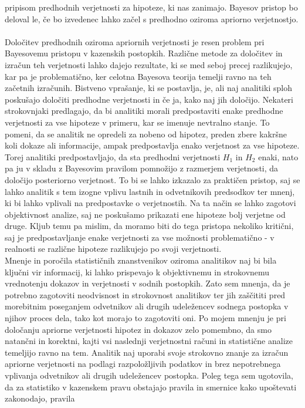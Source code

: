 \documentclass[12pt,a4paper]{amsart}
\theoremstyle{definition} %
\theoremstyle{plain} %
\begin{document}
pripisom predhodnih verjetnosti za hipoteze, ki nas zanimajo. Bayesov pristop bo deloval le, če bo izvedenec lahko začel s predhodno oziroma apriorno verjetnostjo.\\\\
Določitev predhodnih oziroma apriornih verjetnosti je resen problem pri Bayesovemu pristopu v kazenskih postopkih. Različne metode za določitev in izračun teh 
verjetnosti lahko dajejo rezultate, ki se med seboj precej razlikujejo, kar pa je problematično, ker celotna Bayesova teorija temelji ravno na teh začetnih 
izračunih. Bistveno vprašanje, ki se postavlja, je, ali naj analitiki sploh poskušajo določiti predhodne verjetnosti in če ja, kako naj jih določijo. Nekateri 
strokovnjaki predlagajo, da bi analitiki morali predpostaviti enake predhodne verjetnosti za vse hipoteze v primeru, kar se imenuje nevtralno 
stanje. To pomeni, da se analitik ne opredeli za nobeno od hipotez, preden zbere kakršne koli dokaze ali informacije, ampak predpostavlja enako 
verjetnost za vse hipoteze. Torej analitiki predpostavljajo, da sta predhodni verjetnosti $H_1$ in $H_2$ enaki, nato pa 
ju v skladu z Bayesovim pravilom pomnožijo z razmerjem verjetnosti, da določijo posteriorno verjetnost. To bi se lahko izkazalo za praktičen pristop, 
saj se lahko analitik s tem izogne vplivu lastnih in odvetnikovih predsodkov ter mnenj, ki bi lahko vplivali na predpostavke o verjetnostih. Na ta način se 
lahko zagotovi objektivnost analize, saj ne poskušamo prikazati ene hipoteze bolj verjetne od druge. Kljub temu pa mislim, da moramo biti do tega 
pristopa nekoliko kritični, saj je predpostavljanje enake verjetnosti za vse možnosti problematično - v realnosti se različne hipoteze razlikujejo po svoji 
verjetnosti.\\
Mnenje in poročila statističnih znanstvenikov oziroma analitikov naj bi bila ključni vir informacij, ki lahko prispevajo k objektivnemu in strokovnemu 
vrednotenju dokazov in verjetnosti v sodnih postopkih. Zato sem mnenja, da je potrebno zagotoviti neodvisnost in strokovnost analitikov ter jih 
zaščititi pred morebitnim poseganjem odvetnikov ali drugih udeležencev sodnega postopka v njihov proces dela, tako kot morajo to zagotoviti oni. Po mojem mnenju 
je pri določanju apriorne verjetnosti hipotez in dokazov zelo pomembno, da smo natančni in korektni, kajti vsi naslednji verjetnostni računi in statistične analize 
temeljijo ravno na tem. Analitik naj uporabi svoje strokovno znanje za izračun apriorne verjetnosti na podlagi razpoložljivih podatkov in brez nepotrebnega 
vplivanja odvetnikov ali drugih udeležencev postopka. Poleg tega sem ugotovila, da za statistiko v kazenskem pravu obstajajo pravila in smernice kako upoštevati zakonodajo, pravila 
\end{document}
